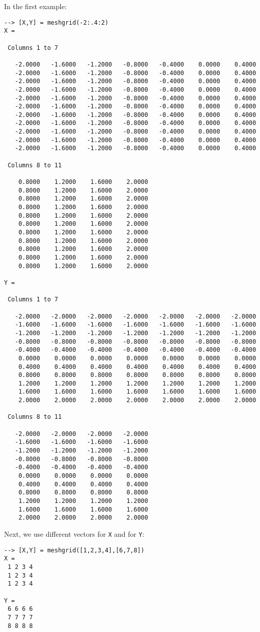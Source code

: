 In the first example:
\begin{verbatim}
--> [X,Y] = meshgrid(-2:.4:2)
X = 

 Columns 1 to 7

   -2.0000   -1.6000   -1.2000   -0.8000   -0.4000    0.0000    0.4000 
   -2.0000   -1.6000   -1.2000   -0.8000   -0.4000    0.0000    0.4000 
   -2.0000   -1.6000   -1.2000   -0.8000   -0.4000    0.0000    0.4000 
   -2.0000   -1.6000   -1.2000   -0.8000   -0.4000    0.0000    0.4000 
   -2.0000   -1.6000   -1.2000   -0.8000   -0.4000    0.0000    0.4000 
   -2.0000   -1.6000   -1.2000   -0.8000   -0.4000    0.0000    0.4000 
   -2.0000   -1.6000   -1.2000   -0.8000   -0.4000    0.0000    0.4000 
   -2.0000   -1.6000   -1.2000   -0.8000   -0.4000    0.0000    0.4000 
   -2.0000   -1.6000   -1.2000   -0.8000   -0.4000    0.0000    0.4000 
   -2.0000   -1.6000   -1.2000   -0.8000   -0.4000    0.0000    0.4000 
   -2.0000   -1.6000   -1.2000   -0.8000   -0.4000    0.0000    0.4000 

 Columns 8 to 11

    0.8000    1.2000    1.6000    2.0000 
    0.8000    1.2000    1.6000    2.0000 
    0.8000    1.2000    1.6000    2.0000 
    0.8000    1.2000    1.6000    2.0000 
    0.8000    1.2000    1.6000    2.0000 
    0.8000    1.2000    1.6000    2.0000 
    0.8000    1.2000    1.6000    2.0000 
    0.8000    1.2000    1.6000    2.0000 
    0.8000    1.2000    1.6000    2.0000 
    0.8000    1.2000    1.6000    2.0000 
    0.8000    1.2000    1.6000    2.0000 

Y = 

 Columns 1 to 7

   -2.0000   -2.0000   -2.0000   -2.0000   -2.0000   -2.0000   -2.0000 
   -1.6000   -1.6000   -1.6000   -1.6000   -1.6000   -1.6000   -1.6000 
   -1.2000   -1.2000   -1.2000   -1.2000   -1.2000   -1.2000   -1.2000 
   -0.8000   -0.8000   -0.8000   -0.8000   -0.8000   -0.8000   -0.8000 
   -0.4000   -0.4000   -0.4000   -0.4000   -0.4000   -0.4000   -0.4000 
    0.0000    0.0000    0.0000    0.0000    0.0000    0.0000    0.0000 
    0.4000    0.4000    0.4000    0.4000    0.4000    0.4000    0.4000 
    0.8000    0.8000    0.8000    0.8000    0.8000    0.8000    0.8000 
    1.2000    1.2000    1.2000    1.2000    1.2000    1.2000    1.2000 
    1.6000    1.6000    1.6000    1.6000    1.6000    1.6000    1.6000 
    2.0000    2.0000    2.0000    2.0000    2.0000    2.0000    2.0000 

 Columns 8 to 11

   -2.0000   -2.0000   -2.0000   -2.0000 
   -1.6000   -1.6000   -1.6000   -1.6000 
   -1.2000   -1.2000   -1.2000   -1.2000 
   -0.8000   -0.8000   -0.8000   -0.8000 
   -0.4000   -0.4000   -0.4000   -0.4000 
    0.0000    0.0000    0.0000    0.0000 
    0.4000    0.4000    0.4000    0.4000 
    0.8000    0.8000    0.8000    0.8000 
    1.2000    1.2000    1.2000    1.2000 
    1.6000    1.6000    1.6000    1.6000 
    2.0000    2.0000    2.0000    2.0000 
\end{verbatim}
Next, we use different vectors for \verb|X| and for \verb|Y|:
\begin{verbatim}
--> [X,Y] = meshgrid([1,2,3,4],[6,7,8])
X = 
 1 2 3 4 
 1 2 3 4 
 1 2 3 4 

Y = 
 6 6 6 6 
 7 7 7 7 
 8 8 8 8 
\end{verbatim}
